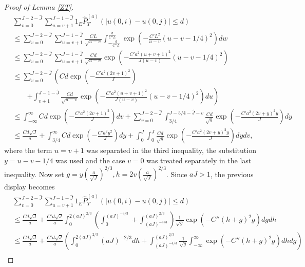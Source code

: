 \documentclass[12pt]{amsart}
\numberwithin{equation}{section}
\newcommand{\1}{\mathbf{1}}
\begin{document}
\begin{proof}[Proof of Lemma \ref{ZT}]
    \begin{equation*}
        \begin{split}
            &\sum_{v=0}^{J-2-\hat{J}}\sum_{u=v+1}^{J-1-\hat{J}}1_E\widehat{P}_T^{(a)}(\vert u(0,i)-u(0,j)\vert\leq d)\\
            &\leq \sum_{v=0}^{J-2-\hat{J}}\sum_{u=v+1}^{J-1-\hat{J}}\frac{CL}{\sqrt{u-v}}\int_{-\frac{d}{C''L}}^{\frac{d}{C''L}}\exp\left(-\frac{C'L^2}{u-v}(u-v-1/4)^2\right)dw\\
            &\leq \sum_{v=0}^{J-2-\hat{J}}\sum_{u=v+1}^{J-1-\hat{J}}\frac{Cd}{\sqrt{u-v}}\exp\left(-\frac{C'a^2(u+v+1)^2}{J(u-v)}(u-v-1/4)^2\right)\\
            &\leq\sum_{v=0}^{J-2-\hat{J}}\left(Cd\exp\left(-\frac{C'a^2(2v+1)^2}{J}\right)\right.\\
            &\quad\quad\left.+\int_{v+1}^{J-1-\hat{J}}\frac{Cd}{\sqrt{u-v}}\exp\left(-\frac{C'a^2(u+v+1)^2}{J(u-v)}(u-v-1/4)^2\right)du\right)\\
            &\leq \int_{-\infty}^{\infty}Cd\exp\left(-\frac{C'a^2(2v+1)^2}{J}\right)dv+\sum_{v=0}^{J-2-\hat{J}}\int_{3/4}^{J-5/4-\hat{J}-v}\frac{Cd}{\sqrt{y}}\exp\left(-\frac{C'a^2(2v+y)^2y}{J}\right)dy\\
            &\leq \frac{Cd\sqrt{J}}{a}+\int_{3/4}^\infty Cd\exp\left(-\frac{C'a^2y^2}{J}\right)dy+\int_{0}^{J}\int_{0}^{J}\frac{Cd}{\sqrt{y}}\exp\left(-\frac{C'a^2(2v+y)^2y}{J}\right)dydv,
        \end{split}
    \end{equation*}
where the term $u=v+1$ was separated in the third inequality, the substitution $y=u-v-1/4$ was used and the case $v=0$ was treated separately in the last inequality. Now set $g=y(\frac{a}{\sqrt{J}})^{2/3},h=2v(\frac{a}{\sqrt{J}})^{2/3}$. Since $aJ>1$, the previous display becomes
\begin{equation}
\label{penal_3}
    \begin{split}
        &\sum_{v=0}^{J-2-\hat{J}}\sum_{u=v+1}^{J-1-\hat{J}}1_E\widehat{P}_T^{(a)}(\vert u(0,i)-u(0,j)\vert\leq d)\\
        &\leq \frac{Cd\sqrt{J}}{a}+\frac{C'd\sqrt{J}}{a}\int_0^{2(aJ)^{2/3}}\left(\int_0^{(aJ)^{-4/3}}+\int_{(aJ)^{-4/3}}^{(aJ)^{2/3}}\right)\frac{1}{\sqrt{g}}\exp\left(-C''(h+g)^2g\right)dgdh\\
        &\leq \frac{Cd\sqrt{J}}{a} + \frac{C'd\sqrt{J}}{a}\left(\int_0^{2(aJ)^{2/3}}(aJ)^{-2/3}dh+\int_{(aJ)^{-4/3}}^{(aJ)^{2/3}}\frac{1}{\sqrt{g}}\int_{-\infty}^{\infty}\exp\left(-C''(h+g)^2g\right)dhdg\right)\\

\end{split}
\end{equation}
\end{proof}
\end{document}

